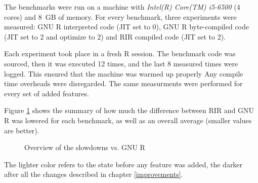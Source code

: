 The benchmarks were run on a machine with \emph{Intel(R) Core(TM) i5-6500} (4 cores) and 8~GB of memory. For every benchmark, three experiments were measured: GNU R interpreted code (JIT set to 0), GNU R byte-compiled code (JIT set to 2 and optimize to 2) and RIR compiled code (JIT set to 2).

Each experiment took place in a fresh R session. The benchmark code was sourced, then it was executed 12 times, and the last 8 measured times were logged. This ensured that the machine was warmed up properly Any compile time overheads were disregarded. The same measurments were performed for every set of added features.

Figure \ref{fig:overall} shows the summary of how much the difference between RIR and GNU R was lowered for each benchmark, as well as an overall average (smaller values are better).

\begin{figure}[htbp]
  \caption{\label{fig:overall}Overview of the slowdowns vs. GNU R}
  \centering
\end{figure}

The lighter color refers to the state before any feature was added, the darker after all the changes described in chapter \ref{improvements}.

